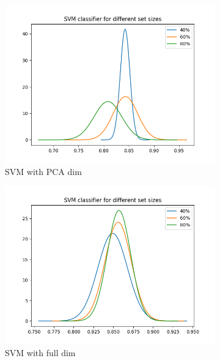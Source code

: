 \documentclass[12pt, a4paper]{article}
\begin{document}
\begin{figure}[H]
\begin{subfigure}{0.3\textwidth}
        \includegraphics[width=\textwidth]{recursos/1/svm_pca}
         \caption{SVM with PCA dim}
    \end{subfigure}
    \begin{subfigure}{0.3\textwidth}
        \includegraphics[width=\textwidth]{recursos/1/svm_full}
        \caption{SVM with full dim}
    \end{subfigure}
    ~
    \begin{subfigure}{0.3\textwidth}

\end{subfigure}
\end{figure}
\end{document}
